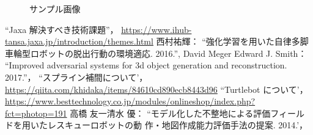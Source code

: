 \documentclass[twocolumn]{jarticle} %
\begin{document}
\begin{figure}[tb]
  \centering
  \large
  \caption{サンプル画像}
  \label{fig:sample}
\end{figure}





\small
\begin{thebibliography}{9}

``Jaxa 解決すべき技術課題''，
  \url{https://www.ihub-tansa.jaxa.jp/introduction/themes.html}
西村祐輝：
  ``強化学習を用いた自律多脚車輪型ロボットの脱出行動の環境適応. 2016.'',
David Meger Edward J. Smith：
  ``Improved adversarial systems for 3d object generation and
  reconstruction. 2017.''，
  ``スプライン補間について'，
  \url{https://qiita.com/khidaka/items/84610cd890ecb8443d96}
  ``Turtlebot について'，
  \url{https://www.besttechnology.co.jp/modules/onlineshop/index.php?fct=photop=191}
  高橋 友一清水 優：
  ``モデル化した不整地による評価フィールドを用いたレスキューロボットの動
  作・地図作成能力評価手法の提案. 2014.'，
\end{thebibliography}
\end{document}
